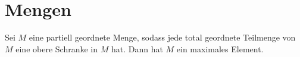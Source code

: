 \section{Mengen}
\begin{Lemma}\label{Satz:Zorn}
    Sei $M$ eine partiell geordnete Menge, sodass jede total geordnete Teilmenge von $M$ eine obere Schranke in $M$ hat. Dann hat $M$ ein maximales Element.
\end{Lemma}